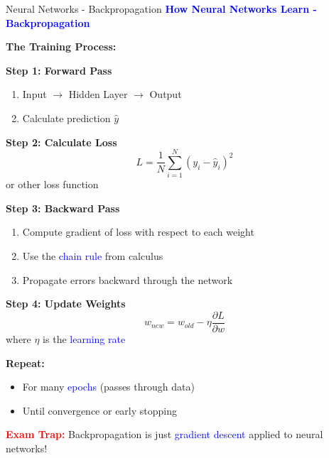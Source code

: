 \documentclass[8pt]{beamer}
\begin{document}
	\begin{frame}{Neural Networks - Backpropagation}
		\fontsize{6.5}{7.5}\selectfont
		\textcolor{blue}{\textbf{How Neural Networks Learn - Backpropagation}}
		
		\textbf{The Training Process:}
		
		\textbf{Step 1: Forward Pass}
		\begin{enumerate}
			\item Input $\rightarrow$ Hidden Layer $\rightarrow$ Output
			\item Calculate prediction $\hat{y}$
		\end{enumerate}
		
		\textbf{Step 2: Calculate Loss}
		\[
		L = \frac{1}{N}\sum_{i=1}^N (y_i - \hat{y}_i)^2
		\]
		or other loss function
		
		\textbf{Step 3: Backward Pass}
		\begin{enumerate}
			\item Compute gradient of loss with respect to each weight
			\item Use the \textcolor{blue}{chain rule} from calculus
			\item Propagate errors backward through the network
		\end{enumerate}
		
		\textbf{Step 4: Update Weights}
		\[
		w_{new} = w_{old} - \eta \frac{\partial L}{\partial w}
		\]
		where $\eta$ is the \textcolor{blue}{learning rate}
		
		\textbf{Repeat:}
		\begin{itemize}
			\item For many \textcolor{blue}{epochs} (passes through data)
			\item Until convergence or early stopping
		\end{itemize}
		
		\textcolor{red}{\textbf{Exam Trap:}} Backpropagation is just \textcolor{blue}{gradient descent} applied to neural networks!
	\end{frame}
	
\end{document}
